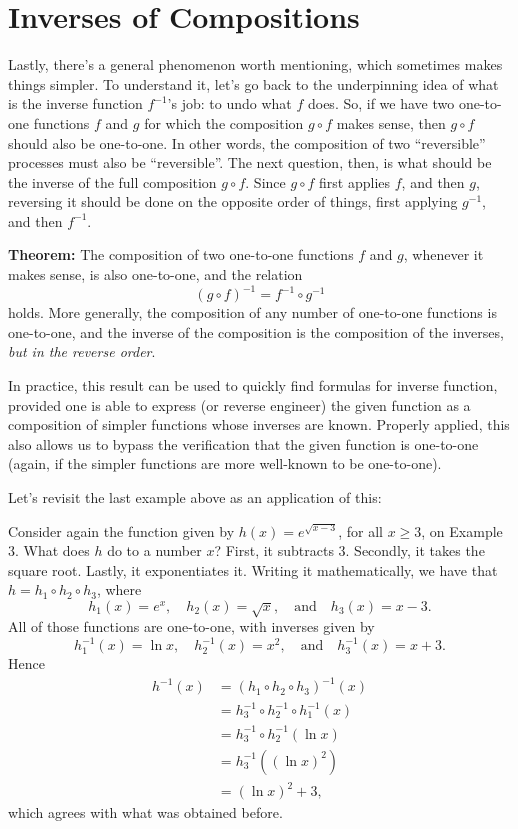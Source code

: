 \documentclass[nooutcomes]{ximera}
\begin{document}
\section{Inverses of Compositions}
Lastly, there's a general phenomenon worth mentioning, which sometimes makes things simpler. To understand it, let's go back to the underpinning idea of what is the inverse function $f^{-1}$'s job: to undo what $f$ does.  So, if we have two one-to-one functions $f$ and $g$ for which the composition $g\circ f$ makes sense, then $g\circ f$ should also be one-to-one. In other words, the composition of two ``reversible'' processes must also be ``reversible''. The next question, then, is what should be the inverse of the full composition $g\circ f$. Since $g\circ f$ first applies $f$, and then $g$, reversing it should be done on the opposite order of things, first applying $g^{-1}$, and then $f^{-1}$.

\begin{callout}
  {\bf Theorem:} The composition of two one-to-one functions $f$ and $g$, whenever it makes sense, is also one-to-one, and the relation $$(g\circ f)^{-1} = f^{-1}\circ g^{-1}$$ holds. More generally, the composition of any number of one-to-one functions is one-to-one, and the inverse of the composition is the composition of the inverses, \emph{but in the reverse order}.
\end{callout}

In practice, this result can be used to quickly find formulas for inverse function, provided one is able to express (or reverse engineer) the given function as a composition of simpler functions whose inverses are known. Properly applied, this also allows us to bypass the verification that the given function is one-to-one (again, if the simpler functions are more well-known to be one-to-one). 

Let's revisit the last example above as an application of this:

\begin{example}
Consider again the function given by $h(x) = e^{\sqrt{x-3}}$, for all $x\geq 3$, on Example 3. What does $h$ do to a number $x$? First, it subtracts $3$. Secondly, it takes the square root. Lastly, it exponentiates it. Writing it mathematically, we have that $h = h_1\circ h_2\circ h_3$, where $$h_1(x) =e^x,\quad h_2(x) = \sqrt{x},\quad\mbox{and}\quad h_3(x)= x-3.$$All of those functions are one-to-one, with inverses given by $$h_1^{-1}(x) = \ln x,\quad h_2^{-1}(x) = x^2,\quad\mbox{and}\quad h_3^{-1}(x) = x+3.$$Hence \begin{align*}h^{-1}(x) &= (h_1\circ h_2\circ h_3)^{-1}(x) \\ &= h_3^{-1}\circ h_2^{-1} \circ h_1^{-1}(x) \\ &= h_3^{-1}\circ h_2^{-1}(\ln x) \\ &= h_3^{-1}((\ln x)^2) \\ &= (\ln x)^2 + 3, \end{align*}which agrees with what was obtained before.
\end{example}
\end{document}
